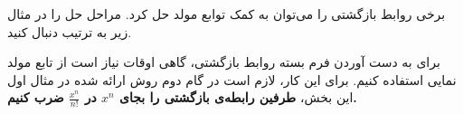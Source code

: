 \p
برخی روابط بازگشتی را می‌توان به کمک توابع مولد حل کرد.
مراحل حل را در مثال زیر به ترتیب دنبال کنید.









\p
برای به دست آوردن فرم بسته روابط بازگشتی، گاهی اوقات نیاز است از تابع مولد نمایی استفاده کنیم.
برای این کار، لازم است در گام دوم روش ارائه شده در مثال اول این بخش، 
\textbf{طرفین رابطه‌ی بازگشتی را بجای
$x^n$ در $\frac{x^n}{n!}$ ضرب کنیم.}

